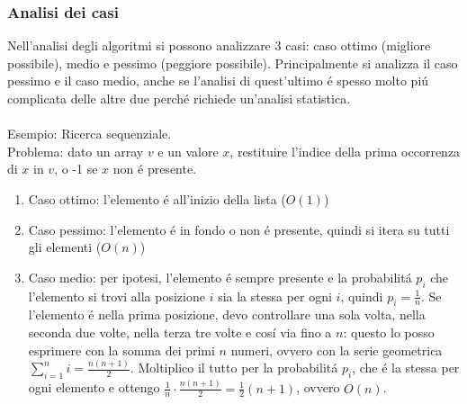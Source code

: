 \documentclass{article}
\begin{document}
\subsubsection{Analisi dei casi}
Nell'analisi degli algoritmi si possono analizzare 3 casi: caso ottimo (migliore possibile), medio e pessimo (peggiore possibile). Principalmente si analizza il caso pessimo e il caso medio, anche se l'analisi di quest'ultimo é spesso molto piú complicata delle altre due perché richiede un'analisi statistica.\\\\
Esempio: Ricerca sequenziale.\\
Problema: dato un array $v$ e un valore $x$, restituire l'indice della prima occorrenza di $x$ in $v$, o -1 se $x$ non é presente.\\
\begin{enumerate}
	\item Caso ottimo: l'elemento é all'inizio della lista ($O(1)$)
	\item Caso pessimo: l'elemento é in fondo o non é presente, quindi si itera su tutti gli elementi ($O(n)$)
	\item Caso medio: per ipotesi, l'elemento é sempre presente e la probabilitá $p_i$ che l'elemento si trovi alla posizione $i$ sia la stessa per ogni $i$, quindi $p_i = \frac{1}{n}$. Se l'elemento é nella prima posizione, devo controllare una sola volta, nella seconda due volte, nella terza tre volte e cosí via fino a $n$: questo lo posso esprimere con la somma dei primi $n$ numeri, ovvero con la serie geometrica $\displaystyle \sum_{i=1}^{n} i = \frac{n(n+1)}{2}$. Moltiplico il tutto per la probabilitá $p_i$, che é la stessa per ogni elemento e ottengo $\displaystyle \frac{1}{n} \cdot \frac{n(n+1)}{2} = \frac{1}{2}(n+1)$, ovvero $O(n)$.
\end{enumerate}
\end{document}
